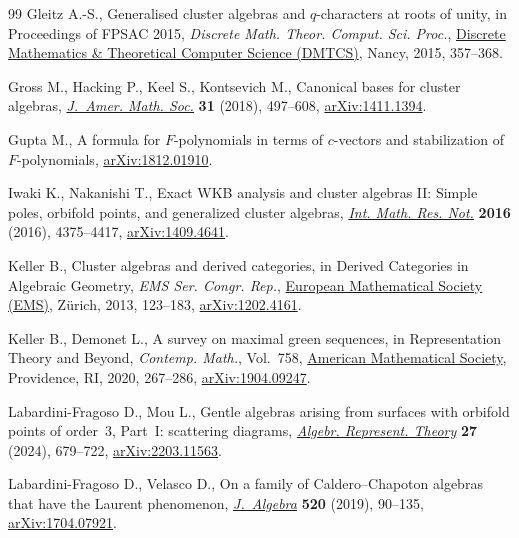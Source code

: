 \documentclass[pdftex]{sigma}
\numberwithin{equation}{section}
\begin{document}
\begin{thebibliography}{99}
Gleitz A.-S., Generalised cluster algebras and {$q$}-characters at roots of
  unity, in Proceedings of {FPSAC} 2015, \textit{Discrete Math. Theor. Comput. Sci. Proc.}, \href{https://doi.org/10.46298/dmtcs.2479}{Discrete Mathematics \& Theoretical Computer Science (DMTCS)}, Nancy,
  2015, 357--368.

Gross M., Hacking P., Keel S., Kontsevich M., Canonical bases for cluster
  algebras,  \href{https://doi.org/10.1090/jams/890}{\textit{J.~Amer. Math. Soc.}} \textbf{31} (2018), 497--608,
  \href{https://arxiv.org/abs/1411.1394}{arXiv:1411.1394}.

Gupta M., A formula for {$F$}-polynomials in terms of $c$-vectors and
  stabilization of {$F$}-polynomials, \href{https://arxiv.org/abs/1812.01910}{arXiv:1812.01910}.

Iwaki K., Nakanishi T., Exact {WKB} analysis and cluster algebras {II}:
  {S}imple poles, orbifold points, and generalized cluster algebras,
  \href{https://doi.org/10.1093/imrn/rnv270}{\textit{Int. Math. Res. Not.}} \textbf{2016} (2016), 4375--4417,
  \href{https://arxiv.org/abs/1409.4641}{arXiv:1409.4641}.

Keller B., Cluster algebras and derived categories, in Derived {C}ategories in
  {A}lgebraic {G}eometry, \textit{EMS Ser. Congr. Rep.},  \href{https://doi.org/10.4171/115-1/6}{European Mathematical Society (EMS)}, Z\"urich, 2013, 123--183, \href{https://arxiv.org/abs/1202.4161}{arXiv:1202.4161}.

Keller B., Demonet L., A survey on maximal green sequences, in Representation
  {T}heory and {B}eyond, \textit{Contemp. Math.}, Vol.~758, \href{https://doi.org/10.1090/conm/758/15239}{American
  Mathematical Society}, Providence, RI, 2020, 267--286, \href{https://arxiv.org/abs/1904.09247}{arXiv:1904.09247}.

Labardini-Fragoso D., Mou L., Gentle algebras arising from surfaces with
  orbifold points of order~3, Part~{I}: scattering diagrams, \href{https://doi.org/10.1007/s10468-023-10233-x}{\textit{Algebr.
  Represent. Theory}} \textbf{27} (2024), 679--722, \href{https://arxiv.org/abs/2203.11563}{arXiv:2203.11563}.

Labardini-Fragoso D., Velasco D., On a family of {C}aldero--{C}hapoton algebras
  that have the {L}aurent phenomenon, \href{https://doi.org/10.1016/j.jalgebra.2018.11.012}{\textit{J.~Algebra}} \textbf{520} (2019),
  90--135, \href{https://arxiv.org/abs/1704.07921}{arXiv:1704.07921}.


\end{thebibliography}
\end{document}

